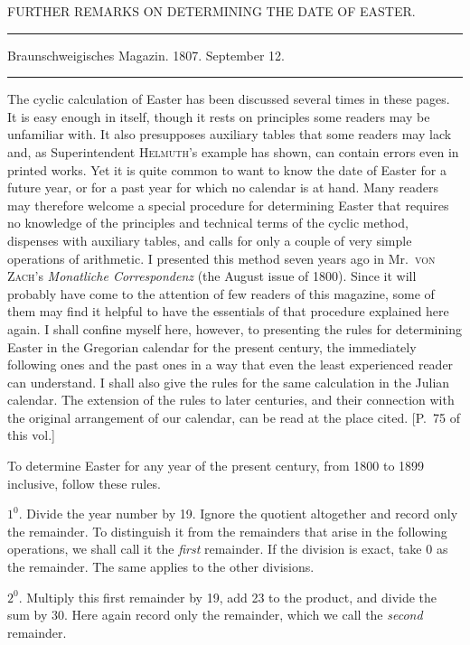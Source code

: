 \clearpage{}%
\begin{center}
{\large FURTHER REMARKS ON DETERMINING THE DATE OF EASTER.\par}
\medskip\hrule\medskip
{\small Braunschweigisches Magazin. 1807. September 12.\par}
\medskip\hrule
\end{center}\medskip
The cyclic calculation of Easter has been discussed several times in these pages. It is easy enough in itself, though it rests on principles some readers may be unfamiliar with. It also presupposes auxiliary tables that some readers may lack and, as Superintendent \textsc{Helmuth}’s example has shown, can contain errors even in printed works. Yet it is quite common to want to know the date of Easter for a future year, or for a past year for which no calendar is at hand. Many readers may therefore welcome a special procedure for determining Easter that requires no knowledge of the principles and technical terms of the cyclic method, dispenses with auxiliary tables, and calls for only a couple of very simple operations of arithmetic. I presented this method seven years ago in Mr.~\textsc{von Zach}’s \textit{Monatliche Correspondenz} (the August issue of 1800). Since it will probably have come to the attention of few readers of this magazine, some of them may find it helpful to have the essentials of that procedure explained here again. I shall confine myself here, however, to presenting the rules for determining Easter in the Gregorian calendar for the present century, the immediately %
%
following ones and the past ones in a way that even the least experienced reader can understand. I shall also give the rules for the same calculation in the Julian calendar. The extension of the rules to later centuries, and their connection with the original arrangement of our calendar, can be read at the place cited. [P.~75 of this vol.]

To determine Easter for any year of the present century, from 1800 to 1899 inclusive, follow these rules.

$1^{0}$. Divide the year number by 19. Ignore the quotient altogether and record only the remainder. To distinguish it from the remainders that arise in the following operations, we shall call it the \textit{first} remainder. If the division is exact, take 0 as the remainder. The same applies to the other divisions.

$2^{0}$. Multiply this first remainder by 19, add 23 to the product, and divide the sum by 30. Here again record only the remainder, which we call the \textit{second} remainder.

